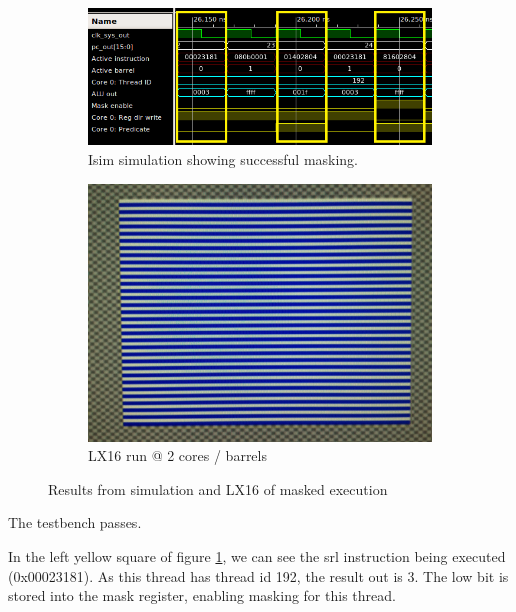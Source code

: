 \documentclass[../main/report.tex]{subfiles}
\begin{document}
\begin{figure}[H]
  \centering
  \begin{subfigure}[b]{\textwidth}
    \includegraphics[width=\textwidth]{../testing/assets/masking-yes.png}
    \caption{Isim simulation showing successful masking.}
    \label{fig:isim-masked-execution}
  \end{subfigure}
  \begin{subfigure}[b]{0.3\textwidth}
    \includegraphics[width=\textwidth]{../testing/assets/lines.jpg}
    \caption{LX16 run @ 2 cores / barrels}
    \label{fig:LX16-masked-execution}
  \end{subfigure}
  \caption{Results from simulation and LX16 of masked execution}
\end{figure}

The testbench passes.

In the left yellow square of figure \ref{fig:isim-masked-execution}, we can see the srl instruction being executed (0x00023181). As this thread has thread id 192, the result out is 3.
The low bit is stored into the mask register, enabling masking for this thread.
\end{document}
